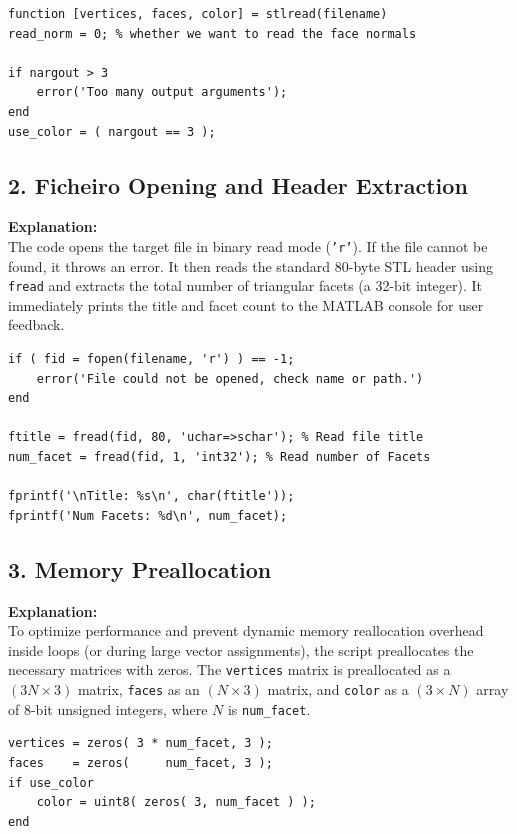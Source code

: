 \begin{lstlisting}
function [vertices, faces, color] = stlread(filename)
read_norm = 0; % whether we want to read the face normals

if nargout > 3
    error('Too many output arguments');
end
use_color = ( nargout == 3 );
\end{lstlisting}


\subsection{2. Ficheiro Opening and Header Extraction}
\textbf{Explanation:} \\
The code opens the target file in binary read mode (\texttt{'r'}). If the file cannot be found, it throws an error. It then reads the standard 80-byte STL header using \texttt{fread} and extracts the total number of triangular facets (a 32-bit integer). It immediately prints the title and facet count to the MATLAB console for user feedback.

\begin{lstlisting}
if ( fid = fopen(filename, 'r') ) == -1;
    error('File could not be opened, check name or path.')
end

ftitle = fread(fid, 80, 'uchar=>schar'); % Read file title
num_facet = fread(fid, 1, 'int32'); % Read number of Facets

fprintf('\nTitle: %s\n', char(ftitle'));
fprintf('Num Facets: %d\n', num_facet);
\end{lstlisting}


\subsection{3. Memory Preallocation}
\textbf{Explanation:} \\
To optimize performance and prevent dynamic memory reallocation overhead inside loops (or during large vector assignments), the script preallocates the necessary matrices with zeros. The \texttt{vertices} matrix is preallocated as a $(3N \times 3)$ matrix, \texttt{faces} as an $(N \times 3)$ matrix, and \texttt{color} as a $(3 \times N)$ array of 8-bit unsigned integers, where $N$ is \texttt{num\_facet}.

\begin{lstlisting}
vertices = zeros( 3 * num_facet, 3 );
faces    = zeros(     num_facet, 3 );
if use_color
    color = uint8( zeros( 3, num_facet ) );
end
\end{lstlisting}


